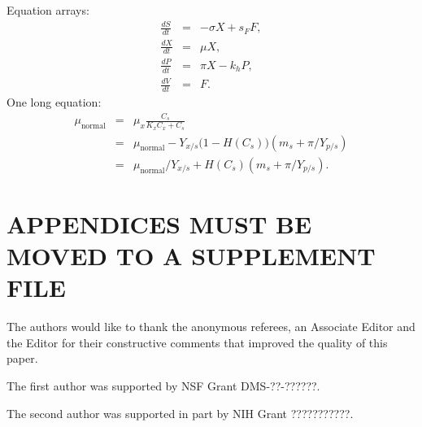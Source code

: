 \documentclass[aoas]{imsart}
\theoremstyle{plain}
\theoremstyle{definition}
\begin{document}
Equation arrays:
\begin{eqnarray}
  \frac{dS}{dt} & = & - \sigma X + s_{F} F,\\
  \frac{dX}{dt} & = &   \mu    X,\\
  \frac{dP}{dt} & = &   \pi    X - k_{h} P,\\
  \frac{dV}{dt} & = &   F.
\end{eqnarray}
One long equation:
\begin{eqnarray}
 \mu_{\text{normal}} & = & \mu_{x} \frac{C_{s}}{K_{x}C_{x}+C_{s}}  \nonumber\\
                     & = & \mu_{\text{normal}} - Y_{x/s}\bigl(1-H(C_{s})\bigr)(m_{s}+\pi /Y_{p/s})\\
                     & = & \mu_{\text{normal}}/Y_{x/s}+ H(C_{s}) (m_{s}+ \pi /Y_{p/s}).\nonumber
\end{eqnarray}

\section*{APPENDICES MUST BE MOVED TO A SUPPLEMENT FILE}
\begin{acks}[Acknowledgments]
The authors would like to thank the anonymous referees, an Associate
Editor and the Editor for their constructive comments that improved the
quality of this paper.
\end{acks}

\begin{funding}
The first author was supported by NSF Grant DMS-??-??????.

The second author was supported in part by NIH Grant ???????????.
\end{funding}

\begin{supplement}
\end{supplement}
\begin{supplement}
\end{supplement}
\end{document}
